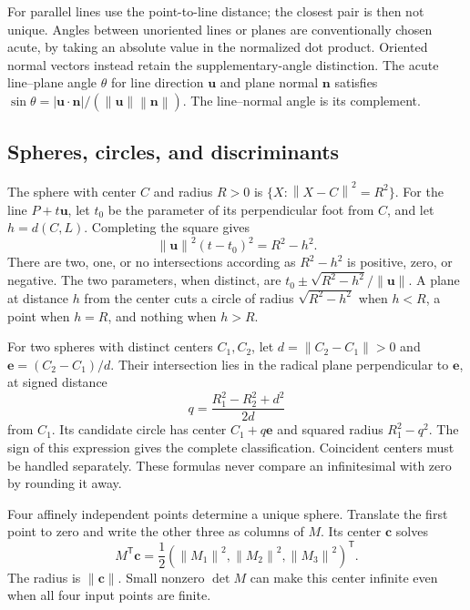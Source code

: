 \documentclass[11pt,letterpaper]{article}
\numberwithin{equation}{section}
\theoremstyle{definition}
\theoremstyle{remark}
\newcommand{\norm}[1]{\left\lVert#1\right\rVert}
\newcommand{\vv}[1]{\bm{#1}}
\newcommand{\transpose}{^{\mathsf T}}
\begin{document}
For parallel lines use the point-to-line distance; the closest pair is then
not unique. Angles between unoriented lines or planes are conventionally
chosen acute, by taking an absolute value in the normalized dot product.
Oriented normal vectors instead retain the supplementary-angle distinction.
The acute line--plane angle $\theta$ for line direction $\vv u$ and
plane normal $\vv n$ satisfies
$\sin\theta=|\vv u\cdot\vv n|/(\norm{\vv u}\norm{\vv n})$.
The line--normal angle is its complement.

\subsection{Spheres, circles, and discriminants}

The sphere with center $C$ and radius $R>0$ is
$\{X:\norm{X-C}^2=R^2\}$. For the line $P+t\vv u$, let $t_0$ be the
parameter of its perpendicular foot from $C$, and let $h=d(C,L)$.
Completing the square gives
\begin{equation}\label{e3:eq:linesphere}
 \norm{\vv u}^2(t-t_0)^2=R^2-h^2.
\end{equation}
There are two, one, or no intersections according as $R^2-h^2$ is positive,
zero, or negative. The two parameters, when distinct, are
$t_0\pm\sqrt{R^2-h^2}/\norm{\vv u}$.
A plane at distance $h$ from the center cuts a circle of radius
$\sqrt{R^2-h^2}$ when $h<R$, a point when $h=R$, and nothing when $h>R$.

For two spheres with distinct centers $C_1,C_2$, let
$d=\norm{C_2-C_1}>0$ and $\vv e=(C_2-C_1)/d$. Their intersection lies in
the radical plane perpendicular to $\vv e$, at signed distance
\[
 q=\frac{R_1^2-R_2^2+d^2}{2d}
\]
from $C_1$. Its candidate circle has center $C_1+q\vv e$ and squared radius
$R_1^2-q^2$. The sign of this expression gives the complete classification.
Coincident centers must be handled separately. These formulas never compare
an infinitesimal with zero by rounding it away.

Four affinely independent points determine a unique sphere. Translate the
first point to zero and write the other three as columns of $M$. Its center
$\vv c$ solves
\begin{equation}\label{e3:eq:tetra-sphere}
 M\transpose\vv c=\frac12
 (\norm{M_1}^2,\norm{M_2}^2,\norm{M_3}^2)\transpose.
\end{equation}
The radius is $\norm{\vv c}$. Small nonzero $\det M$ can make this center
infinite even when all four input points are finite.
\end{document}

